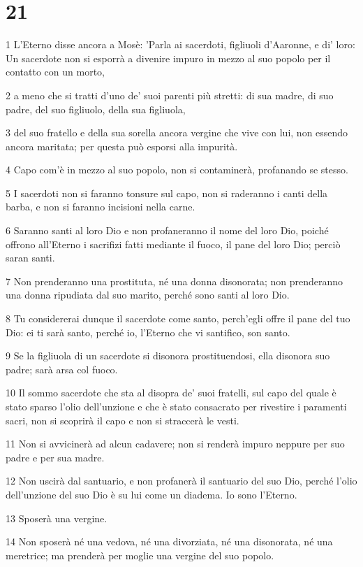 \chapter{21}

\par 1 L'Eterno disse ancora a Mosè: 'Parla ai sacerdoti, figliuoli d'Aaronne, e di' loro: Un sacerdote non si esporrà a divenire impuro in mezzo al suo popolo per il contatto con un morto,
\par 2 a meno che si tratti d'uno de' suoi parenti più stretti: di sua madre, di suo padre, del suo figliuolo, della sua figliuola,
\par 3 del suo fratello e della sua sorella ancora vergine che vive con lui, non essendo ancora maritata; per questa può esporsi alla impurità.
\par 4 Capo com'è in mezzo al suo popolo, non si contaminerà, profanando se stesso.
\par 5 I sacerdoti non si faranno tonsure sul capo, non si raderanno i canti della barba, e non si faranno incisioni nella carne.
\par 6 Saranno santi al loro Dio e non profaneranno il nome del loro Dio, poiché offrono all'Eterno i sacrifizi fatti mediante il fuoco, il pane del loro Dio; perciò saran santi.
\par 7 Non prenderanno una prostituta, né una donna disonorata; non prenderanno una donna ripudiata dal suo marito, perché sono santi al loro Dio.
\par 8 Tu considererai dunque il sacerdote come santo, perch'egli offre il pane del tuo Dio: ei ti sarà santo, perché io, l'Eterno che vi santifico, son santo.
\par 9 Se la figliuola di un sacerdote si disonora prostituendosi, ella disonora suo padre; sarà arsa col fuoco.
\par 10 Il sommo sacerdote che sta al disopra de' suoi fratelli, sul capo del quale è stato sparso l'olio dell'unzione e che è stato consacrato per rivestire i paramenti sacri, non si scoprirà il capo e non si straccerà le vesti.
\par 11 Non si avvicinerà ad alcun cadavere; non si renderà impuro neppure per suo padre e per sua madre.
\par 12 Non uscirà dal santuario, e non profanerà il santuario del suo Dio, perché l'olio dell'unzione del suo Dio è su lui come un diadema. Io sono l'Eterno.
\par 13 Sposerà una vergine.
\par 14 Non sposerà né una vedova, né una divorziata, né una disonorata, né una meretrice; ma prenderà per moglie una vergine del suo popolo.
